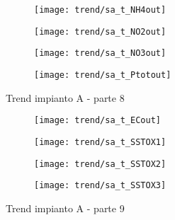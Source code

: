 \begin{sidewaysfigure}[h]\ContinuedFloat
	\renewcommand*\thesubfigure{(\arabic{subfigure})}
	\begin{subfigure}{0.49\textwidth}
		\texttt{[image: trend/sa\_t\_NH4out]}
		\caption{}
		\centering
	\end{subfigure}
	\begin{subfigure}{0.49\textwidth}
		\texttt{[image: trend/sa\_t\_NO2out]}
		\caption{}
		\centering
	\end{subfigure}

	\begin{subfigure}{0.49\textwidth}
		\texttt{[image: trend/sa\_t\_NO3out]}
		\caption{}
		\centering
	\end{subfigure}
	\begin{subfigure}{0.49\textwidth}
		\texttt{[image: trend/sa\_t\_Ptotout]}	
		\caption{}
		\centering
	\end{subfigure}
	\caption{Trend impianto A - parte 8}
\end{sidewaysfigure}

\begin{sidewaysfigure}[h]\ContinuedFloat
	\renewcommand*\thesubfigure{(\arabic{subfigure})}
	\begin{subfigure}{0.49\textwidth}
		\texttt{[image: trend/sa\_t\_ECout]}
		\caption{}
		\centering
	\end{subfigure}
	\begin{subfigure}{0.49\textwidth}
		\texttt{[image: trend/sa\_t\_SSTOX1]}
		\caption{}
		\centering
	\end{subfigure}

	\begin{subfigure}{0.49\textwidth}
		\texttt{[image: trend/sa\_t\_SSTOX2]}
		\caption{}
		\centering
	\end{subfigure}
	\begin{subfigure}{0.49\textwidth}
		\texttt{[image: trend/sa\_t\_SSTOX3]}	
		\caption{}
		\centering
	\end{subfigure}
	\caption{Trend impianto A - parte 9}
\end{sidewaysfigure}

